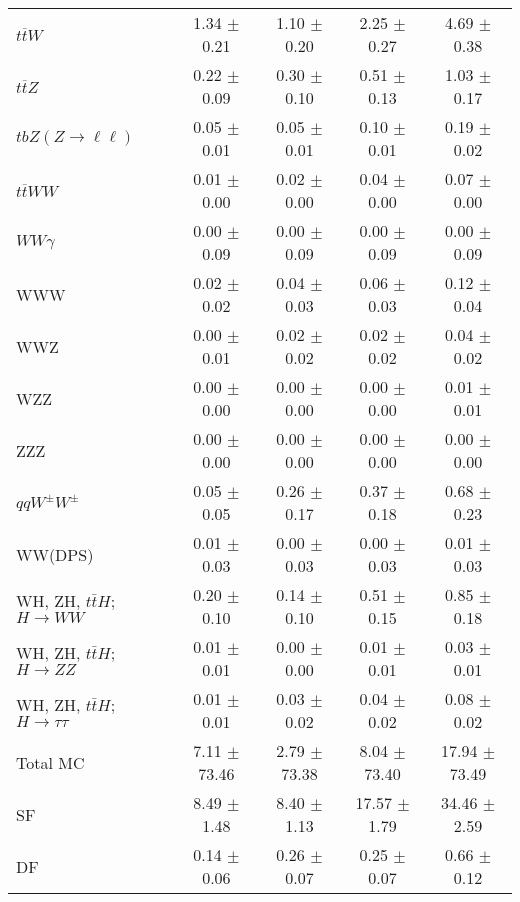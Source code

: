 \begin{tabular}{l|cccc}
                   $t\overline{t}W$ &  1.34 $\pm$  0.21 &  1.10 $\pm$  0.20 &  2.25 $\pm$  0.27 &  4.69 $\pm$  0.38 \\
                   $t\overline{t}Z$ &  0.22 $\pm$  0.09 &  0.30 $\pm$  0.10 &  0.51 $\pm$  0.13 &  1.03 $\pm$  0.17 \\
    $tbZ (Z \rightarrow \ell \ell)$ &  0.05 $\pm$  0.01 &  0.05 $\pm$  0.01 &  0.10 $\pm$  0.01 &  0.19 $\pm$  0.02 \\
                  $t\overline{t}WW$ &  0.01 $\pm$  0.00 &  0.02 $\pm$  0.00 &  0.04 $\pm$  0.00 &  0.07 $\pm$  0.00 \\
                         $WW\gamma$ &  0.00 $\pm$  0.09 &  0.00 $\pm$  0.09 &  0.00 $\pm$  0.09 &  0.00 $\pm$  0.09 \\
                                WWW &  0.02 $\pm$  0.02 &  0.04 $\pm$  0.03 &  0.06 $\pm$  0.03 &  0.12 $\pm$  0.04 \\
                                WWZ &  0.00 $\pm$  0.01 &  0.02 $\pm$  0.02 &  0.02 $\pm$  0.02 &  0.04 $\pm$  0.02 \\
                                WZZ &  0.00 $\pm$  0.00 &  0.00 $\pm$  0.00 &  0.00 $\pm$  0.00 &  0.01 $\pm$  0.01 \\
                                ZZZ &  0.00 $\pm$  0.00 &  0.00 $\pm$  0.00 &  0.00 $\pm$  0.00 &  0.00 $\pm$  0.00 \\
                 $qqW^{\pm}W^{\pm}$ &  0.05 $\pm$  0.05 &  0.26 $\pm$  0.17 &  0.37 $\pm$  0.18 &  0.68 $\pm$  0.23 \\
                            WW(DPS) &  0.01 $\pm$  0.03 &  0.00 $\pm$  0.03 &  0.00 $\pm$  0.03 &  0.01 $\pm$  0.03 \\
WH, ZH, $t\bar{t}H$; $H \rightarrow WW$ &  0.20 $\pm$  0.10 &  0.14 $\pm$  0.10 &  0.51 $\pm$  0.15 &  0.85 $\pm$  0.18 \\
WH, ZH, $t\bar{t}H$; $H \rightarrow ZZ$ &  0.01 $\pm$  0.01 &  0.00 $\pm$  0.00 &  0.01 $\pm$  0.01 &  0.03 $\pm$  0.01 \\
WH, ZH, $t\bar{t}H$; $H \rightarrow \tau\tau$ &  0.01 $\pm$  0.01 &  0.03 $\pm$  0.02 &  0.04 $\pm$  0.02 &  0.08 $\pm$  0.02 \\
\hline\hline
                           Total MC &  7.11 $\pm$ 73.46 &  2.79 $\pm$ 73.38 &  8.04 $\pm$ 73.40 & 17.94 $\pm$ 73.49 \\
\hline
                                 SF &  8.49 $\pm$  1.48 &  8.40 $\pm$  1.13 & 17.57 $\pm$  1.79 & 34.46 $\pm$  2.59 \\
                                 DF &  0.14 $\pm$  0.06 &  0.26 $\pm$  0.07 &  0.25 $\pm$  0.07 &  0.66 $\pm$  0.12 \\

\end{tabular}
